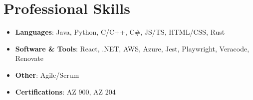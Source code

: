 \documentclass[letterpaper,11pt]{article}
\newcommand{\resumeSubHeadingListStart}{\begin{itemize}[leftmargin=*]}
\newcommand{\resumeSubHeadingListEnd}{\end{itemize}}
\begin{document}

\section{Professional Skills}
 \resumeSubHeadingListStart
    \item{
     \textbf{Languages}{: Java, Python, C/C++, C\#, JS/TS, HTML/CSS, Rust }
     }
     \item{
     \textbf{Software \& Tools}{: React, .NET, AWS, Azure, Jest, Playwright, Veracode, Renovate}
    }
    \item{
     \textbf{Other}{: Agile/Scrum}
    }
    \item{
     \textbf{Certifications}{: AZ 900, AZ 204}
    }
 \resumeSubHeadingListEnd

\end{document}
